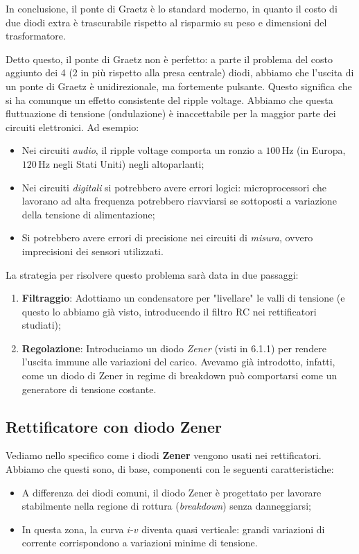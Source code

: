 \documentclass[11pt,a4paper]{article}
\begin{document}
In conclusione, il ponte di Graetz è lo standard moderno, in quanto il costo di due diodi extra è trascurabile rispetto al risparmio su peso e dimensioni del trasformatore.

Detto questo, il ponte di Graetz non è perfetto: a parte il problema del costo aggiunto dei 4 (2 in più rispetto alla presa centrale) diodi, abbiamo che l’uscita di un ponte di Graetz è unidirezionale, ma fortemente pulsante. Questo significa che si ha comunque un effetto consistente del ripple voltage. Abbiamo che questa fluttuazione di tensione (ondulazione) è inaccettabile per la maggior parte dei circuiti elettronici. Ad esempio:

\begin{itemize}
	\item Nei circuiti \textit{audio}, il ripple voltage comporta un ronzio a $100 \, \mathrm{Hz}$ (in Europa, $120 \, \mathrm{Hz}$ negli Stati Uniti) negli altoparlanti;
	\item Nei circuiti \textit{digitali} si potrebbero avere errori logici: microprocessori che lavorano ad alta frequenza potrebbero riavviarsi se sottoposti a variazione della tensione di alimentazione;
	\item Si potrebbero avere errori di precisione nei circuiti di \textit{misura}, ovvero imprecisioni dei sensori utilizzati.
\end{itemize}

La strategia per risolvere questo problema sarà data in due passaggi:
\begin{enumerate}
	\item \textbf{Filtraggio}: Adottiamo un condensatore per "livellare" le valli di tensione (e questo lo abbiamo già visto, introducendo il filtro RC nei rettificatori studiati);
	\item \textbf{Regolazione}: Introduciamo un diodo \textit{Zener} (visti in 6.1.1) per rendere l’uscita immune alle variazioni del carico. Avevamo già introdotto, infatti, come un diodo di Zener in regime di breakdown può comportarsi come un generatore di tensione costante.
\end{enumerate}

\subsection{Rettificatore con diodo Zener}
Vediamo nello specifico come i diodi \textbf{Zener} vengono usati nei rettificatori. Abbiamo che questi sono, di base, componenti con le seguenti caratteristiche:
\begin{itemize}
    \item A differenza dei diodi comuni, il diodo Zener è progettato per lavorare stabilmente nella regione di rottura (\textit{breakdown}) senza danneggiarsi;
	\item In questa zona, la curva $i\text{-}v$ diventa quasi verticale: grandi variazioni di corrente corrispondono a variazioni minime di tensione.
\end{itemize}
\end{document}
